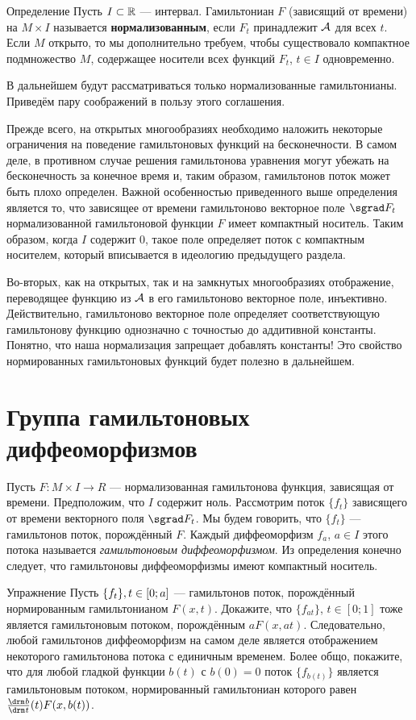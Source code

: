 \begin{thm}{Определение}
Пусть $I \subset \mathbb{R}$ --- интервал.
Гамильтониан $F$ (зависящий от времени) на $M \times I$ называется \textbf{нормализованным}, если $F_t$ принадлежит $\mathcal{A}$ для всех $t$.
Если $M$ открыто, то мы дополнительно требуем, чтобы существовало компактное подмножество $M$, содержащее носители всех функций $F_t$, $t \in I$ одновременно.
\end{thm}

В дальнейшем будут рассматриваться только нормализованные гамильтонианы.
Приведём пару соображений в пользу этого соглашения.

Прежде всего, на открытых многообразиях необходимо наложить некоторые ограничения на поведение гамильтоновых функций на бесконечности.
В самом деле, в противном случае решения гамильтонова уравнения могут
убежать на бесконечность за конечное время и, таким образом, гамильтонов поток может быть плохо определен.
Важной особенностью приведенного выше определения является то, что зависящее от времени гамильтоново векторное поле $\sgrad F_t$ нормализованной гамильтоновой функции $F$ имеет компактный носитель.
Таким образом, когда $I$ содержит $0$, такое поле определяет поток с компактным носителем, который вписывается в идеологию предыдущего раздела.

Во-вторых, как на открытых, так и на замкнутых многообразиях отображение, переводящее функцию из $\mathcal{A}$ в его гамильтоново векторное поле, инъективно.
Действительно, гамильтоново векторное поле определяет соответствующую гамильтонову функцию однозначно с точностью до аддитивной константы.
Понятно, что наша нормализация запрещает добавлять константы!
Это свойство нормированных гамильтоновых функций будет полезно в дальнейшем.

\section{Группа гамильтоновых диффеоморфизмов}\label{1.4}

Пусть $F: M \times I \to R$ --- нормализованная гамильтонова функция, зависящая от времени.
Предположим, что $I$ содержит ноль.
Рассмотрим поток $\{f_t\}$ зависящего от времени векторного поля $\sgrad F_t$.
Мы будем говорить, что $\{f_t\}$ --- гамильтонов поток, порождённый $F$.
Каждый диффеоморфизм $f_a$, $a \in I$ этого потока называется \emph{гамильтоновым диффеоморфизмом}.
Из определения конечно следует, что гамильтоновы диффеоморфизмы имеют компактный носитель.

\begin{thm}{Упражнение}\label{1.4.A}
Пусть $\{f_t\}, t \z\in [0; a]$ --- гамильтонов поток, порождённый нормированным гамильтонианом $ F (x, t)$.
Докажите, что $\{f_{at}\}$, $t \in [0; 1]$ тоже является гамильтоновым потоком, порождённым $aF (x, at)$.
Следовательно, любой гамильтонов диффеоморфизм на самом деле является отображением некоторого гамильтонова потока с единичным временем.
Более общо, покажите, что для любой гладкой функции $b (t)$ с $b (0) =
0$ поток $\{f_{b (t)}\}$ является гамильтоновым потоком, нормированный
гамильтониан которого равен $\tfrac{\d b}{\d t} (t) F (x, b (t))$.
\end{thm}

